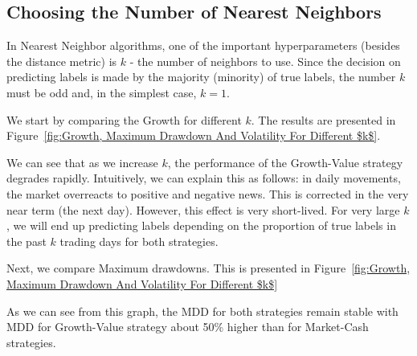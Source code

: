 \documentclass{article}
\begin{document}
\begin{comment}
\begin{figure}[htbp]
  \centering
  \texttt{[image: plots/gv vs mc.png]}
  \caption{Predict Labels of GV-1L And MC-1L Strategy}
  \label{fig:winer_loser_fridays}
\end{figure}
\end{comment}



\subsection{Choosing the Number of Nearest Neighbors}\label{section_choosing_k}

In Nearest Neighbor algorithms, one of the important hyperparameters (besides the distance metric) is $k$ - the number of neighbors to use. Since the decision on predicting labels is made by the majority (minority) of true labels, the number $k$ must be odd and, in the simplest case, $k=1$.

We start by comparing the Growth for different $k$. The results are presented in
Figure~\ref{fig:Growth, Maximum Drawdown And Volatility For Different $k$}.

We can see that as we increase $k$, the performance of the Growth-Value strategy degrades rapidly. Intuitively, we can explain this as follows: in daily movements, the market overreacts to positive and negative news. This is corrected in the very near term (the next day). However, this effect is very short-lived. For very large $k$, we will end up predicting labels depending on the proportion of true labels in the past $k$ trading days for both strategies.

Next, we compare Maximum drawdowns. This is presented in 
Figure~\ref{fig:Growth, Maximum Drawdown And Volatility For Different $k$}
\begin{comment}
    

\begin{figure}[h!]
  \centering
  \texttt{[image: plots/drawdown.png]}
  \caption{Comparison of  for Different $k$}
  \label{fig:mdd_winner_loser_fridays}
\end{figure}
\end{comment}
As we can see from this graph, the MDD for both strategies remain stable with MDD for Growth-Value strategy
about 50\% higher than for Market-Cash strategies.
\end{document}
